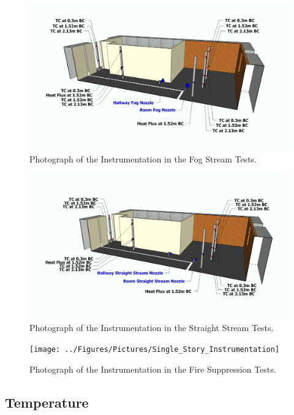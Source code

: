 \documentclass[12pt,oneside]{book}
\begin{document}
\begin{figure}[!ht]
	\includegraphics[width=6in]{../Figures/Pictures/Fog_Instrumentation}
	\caption{Photograph of the Instrumentation in the Fog Stream Tests.}
	\label{fig:Fog_Instrumentation}
\end{figure}

\begin{figure}[!ht]
	\includegraphics[width=6in]{../Figures/Pictures/Straight_Stream_Instrumentation}
	\caption{Photograph of the Instrumentation in the Straight Stream Tests.}
	\label{fig:Straigh_Stream_Instrumentation}
\end{figure}

\begin{figure}[!ht]
	\texttt{[image: ../Figures/Pictures/Single\_Story\_Instrumentation]}
	\caption{Photograph of the Instrumentation in the Fire Suppression Tests.}
	\label{fig:Fire_Suppression_Instrumentation}
\end{figure}

\subsection{Temperature}
\label{subsec:Temperature}
\end{document}
